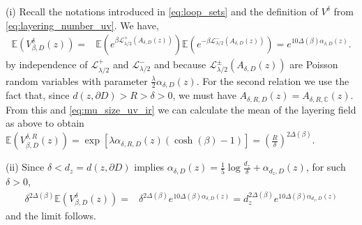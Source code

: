 \documentclass[a4paper, 11pt, reqno]{amsart}
\theoremstyle{definition} \newtheorem{defn}{Definition}[section]
\theoremstyle{remark} \newtheorem{rem}[defn]{Remark}
\theoremstyle{remark} \newtheorem*{rem*}{Remark}
\theoremstyle{plain} \newtheorem{thm}[defn]{Theorem}
\theoremstyle{plain} \newtheorem{lem}[defn]{Lemma}
\theoremstyle{plain} \newtheorem{prop}[defn]{Proposition}
\theoremstyle{plain} \newtheorem{cor}[defn]{Corollary}
\theoremstyle{remark} \newtheorem{exm}[defn]{\textbf{Example}}
\theoremstyle{remark} \newtheorem{exms}[defn]{\textbf{Examples}}
\theoremstyle{remark} \newtheorem*{bl}{}
\numberwithin{equation}{section} %
\newcommand{\mc}{\mathcal}
\newcommand{\C}{\mathbb{C}}
\newcommand{\E}{\mathbb{E}}
\begin{document}
		(i)  Recall the notations introduced in \eqref{eq:loop_sets} and the definition of $V^{\delta}$ from \eqref{eq:layering_number_uv}. We have,
		\begin{align}
			\E (V^{\delta}_{\beta, D}(z)) 
            = & \E \left( e^{\beta \mc{L}_{\lambda/2}^+(A_{\delta, D}(z))}\right) \E \left( e^{-\beta \mc{L}_{\lambda/2}^-(A_{\delta, D}(z))}\right) 
            = e^{10\Delta(\beta) \alpha_{\delta, D}(z) }.
		\end{align}
		by independence of $\mc{L}_{\lambda/2}^+$ and $\mc{L}_{\lambda/2}^-$ and because $\mc{L}_{\lambda/2}^{\pm}(A_{\delta, D}(z))$ are Poisson random variables with parameter $\frac{\lambda}{2}\alpha_{\delta, D} (z)$. 	For the second relation we use the fact that, since $d(z, \partial D)>R>\delta>0$, we must have $A_{\delta, R, D}(z) = A_{\delta, R, \C}(z)$. From this and \eqref{eq:mu_size_uv_ir} we can calculate the mean of the layering field as above to obtain $\E \left( V^{\delta, R} _{\beta, D}(z)\right) = \exp [\lambda  \alpha_{\delta, R, D} (z) (\cosh(\beta) -1)] = \left(\frac{R}{\delta}\right)^{2\Delta(\beta)}$.

        (ii) Since $\delta < d_z = d(z, \partial D)$ implies $\alpha_{\delta, D}(z) = \frac{1}{5} \log\frac{d_z}{\delta} + \alpha_{d_z, D}(z)$, for such $\delta>0$,
		\begin{align}\label{eq:conv_1_pt}
			\delta^{2\Delta(\beta)} \E (V^{\delta}_{\beta, D}(z)) = & \delta^{2\Delta(\beta)} e^{10\Delta(\beta) \alpha_{\delta, D}(z)} 
			=  d_z^{2\Delta(\beta)} e^{10\Delta(\beta) \alpha_{d_z, D}(z)} 
		\end{align}
        and the limit follows.				
		
\end{document}
